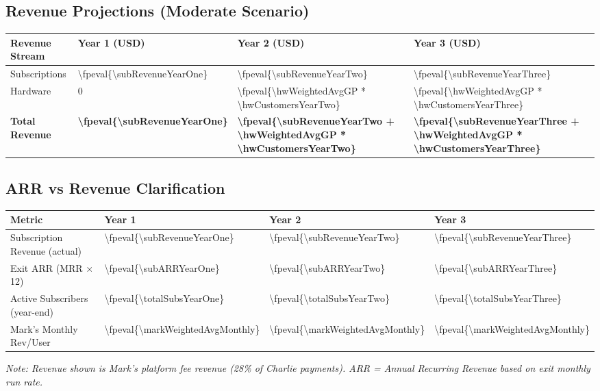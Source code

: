 \documentclass[11pt]{article}
\newcommand{\numfpeval}[1]{\num{\fpeval{#1}}}
\newcommand{\numint}[1]{\num[round-precision=0]{\fpeval{#1}}}
\begin{document}
\subsection{Revenue Projections (Moderate Scenario)}
\begin{table}[H]
\centering
\begin{tabularx}{\linewidth}{l Y Y Y}
\toprule
Revenue Stream & Year 1 (USD) & Year 2 (USD) & Year 3 (USD) \\\midrule
Subscriptions & \numint{\subRevenueYearOne} & \numint{\subRevenueYearTwo} & \numint{\subRevenueYearThree} \\
Hardware & \num{0} & \numint{\hwWeightedAvgGP * \hwCustomersYearTwo} & \numint{\hwWeightedAvgGP * \hwCustomersYearThree} \\\midrule
\textbf{Total Revenue} & \textbf{\numint{\subRevenueYearOne}} & \textbf{\numint{\subRevenueYearTwo + \hwWeightedAvgGP * \hwCustomersYearTwo}} & \textbf{\numint{\subRevenueYearThree + \hwWeightedAvgGP * \hwCustomersYearThree}} \\
\bottomrule
\end{tabularx}
\end{table}

\subsection{ARR vs Revenue Clarification}
\begin{table}[H]
\centering
\begin{tabularx}{\linewidth}{l Y Y Y}
\toprule
Metric & Year 1 & Year 2 & Year 3 \\\midrule
Subscription Revenue (actual) & \numint{\subRevenueYearOne} & \numint{\subRevenueYearTwo} & \numint{\subRevenueYearThree} \\
Exit ARR (MRR $\times$ 12) & \numint{\subARRYearOne} & \numint{\subARRYearTwo} & \numint{\subARRYearThree} \\
Active Subscribers (year-end) & \numint{\totalSubsYearOne} & \numint{\totalSubsYearTwo} & \numint{\totalSubsYearThree} \\
Mark's Monthly Rev/User & \numfpeval{\markWeightedAvgMonthly} & \numfpeval{\markWeightedAvgMonthly} & \numfpeval{\markWeightedAvgMonthly} \\
\bottomrule
\end{tabularx}
\end{table}
\textit{Note: Revenue shown is Mark's platform fee revenue (28\% of Charlie payments). ARR = Annual Recurring Revenue based on exit monthly run rate.}
\end{document}
